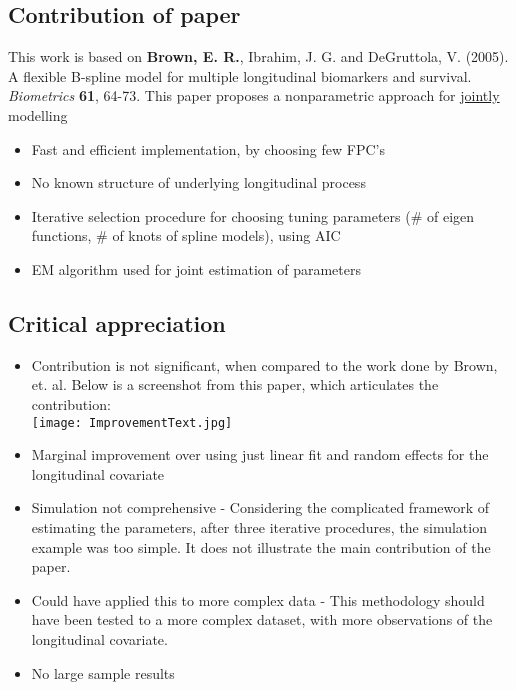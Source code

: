 \documentclass[11pt]{extarticle} %
\begin{document}
\subsection*{Contribution of paper}
This work is based on {\bf{Brown, E. R.}}, Ibrahim, J. G. and DeGruttola, V. (2005). A flexible B-spline model for multiple
longitudinal biomarkers and survival. {\emph{Biometrics}} {\bf{61}}, 64-73. This paper proposes a nonparametric approach for {\underline{jointly}} modelling
\begin {itemize}
\item Fast and efficient implementation, by choosing few FPC's
\item No known structure of underlying longitudinal process
\item Iterative selection procedure for choosing tuning parameters (\# of eigen functions, \# of knots of spline models), using AIC 
\item EM algorithm used for joint estimation of parameters
\end{itemize}

\subsection*{Critical appreciation}
\begin{itemize}
\item Contribution is not significant, when compared to the work done by Brown, et. al. Below is a screenshot from this paper, which articulates the contribution: \\
\texttt{[image: ImprovementText.jpg]} \\
\item Marginal improvement over using just linear fit and random effects for the longitudinal covariate
\item Simulation not comprehensive - Considering the complicated framework of estimating the parameters, after three iterative procedures, the simulation example was too simple. It does not illustrate the main contribution of the paper. 
\item Could have applied this to more complex data - This methodology should have been tested to a more complex dataset, with more observations of the longitudinal covariate. 
\item No large sample results
\end{itemize}


%
%
\end{document}
